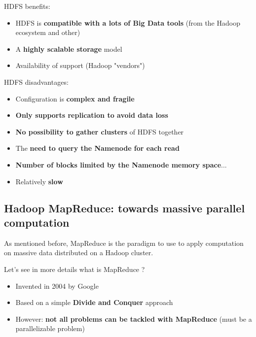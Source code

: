 \documentclass{beamer}[10pt, usepdftitle=false handout]
\begin{document}
\begin{frame}

HDFS benefits:
\vspace*{0.6em}

\begin{itemize}
\item{HDFS is \textbf{compatible with a lots of Big Data tools} (from the Hadoop ecosystem and other)}
\item{A \textbf{highly scalable storage} model}
\item{Availability of support (Hadoop "vendors")}
\end{itemize}
\vspace*{0.6em}

HDFS disadvantages:
\vspace*{0.6em}

\begin{itemize}
	\item{Configuration is \textbf{complex and fragile}}
	\item{\textbf{Only supports replication to avoid data loss}}
	\item{\textbf{No possibility to gather clusters} of HDFS together}
	\item{The \textbf{need to query the Namenode for each read}}
	\item{\textbf{Number of blocks limited by the Namenode memory space}... }
	\item{Relatively \textbf{slow}}
\end{itemize}

\end{frame}

\subsection{Hadoop MapReduce: towards massive parallel computation}

\begin{frame}

As mentioned before, MapReduce is the paradigm to use to apply computation on massive data distributed on a Hadoop cluster.
\vspace*{0.6em}

Let's see in more details what is MapReduce ?
\vspace*{0.6em}

\begin{itemize}
	\item{Invented in 2004 by Google}
	\item{Based on a simple \textbf{Divide and Conquer} approach}
	\item{However: \textbf{not all problems can be tackled with MapReduce} (must be a parallelizable problem)}
\end{itemize}


\end{frame}
\end{document}
